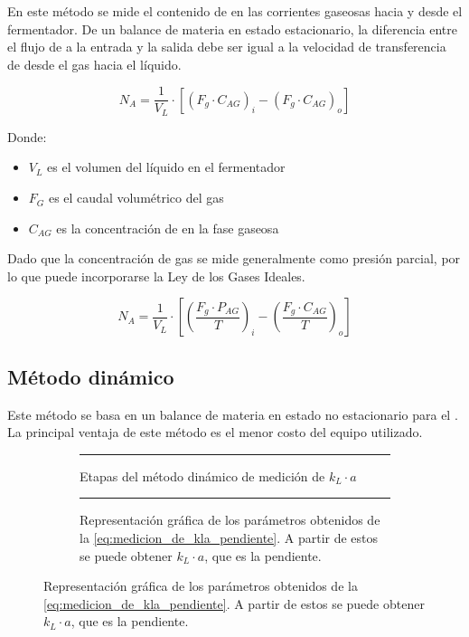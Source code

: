\documentclass{AsignaturaResumen}
\begin{document}
En este método se mide el contenido de  en las corrientes gaseosas hacia y desde el fermentador. De un balance de materia en estado estacionario, la diferencia entre el flujo de  a la entrada y la salida debe ser igual a la velocidad de transferencia de  desde el gas hacia el líquido.

\begin{equation}
    N_{A} = \frac{1}{V_{L}} \cdot \left[(F_{g} \cdot C_{AG})_{i} - (F_{g} \cdot C_{AG})_{o}\right]
\end{equation}

Donde:

\begin{itemize}
    \item $V_{L}$ es el volumen del líquido en el fermentador
    \item $F_{G}$ es el caudal volumétrico del gas
    \item $C_{AG}$ es la concentración de  en la fase gaseosa
\end{itemize}

Dado que la concentración de gas se mide generalmente como presión parcial, por lo que puede incorporarse la Ley de los Gases Ideales.

\begin{equation}
    N_{A} = \frac{1}{V_{L}} \cdot \left[\left(\frac{F_{g} \cdot P_{AG}}{T}\right)_{i} - \left(\frac{F_{g} \cdot C_{AG}}{T}\right)_{o}\right]
\end{equation}

\subsection{Método dinámico}

Este método se basa en un balance de materia en estado no estacionario para el . La principal ventaja de este método es el menor costo del equipo utilizado.

\begin{figure}
    \begin{subfigure}[t]{0.5\linewidth}
        \resizebox{\linewidth}{!}{}
        \rule{\linewidth}{0.5pt}
        \caption{Etapas del método dinámico de medición de $k_{L} \cdot a$}
        \label{fig:medicion_de_kla_metodo_dimanico}
    \end{subfigure}
    \hfill
    \begin{subfigure}[t]{0.475\linewidth}
        \resizebox{\linewidth}{!}{}
        \rule{\linewidth}{0.5pt}
        \caption{Representación gráfica de los parámetros obtenidos de la \autoref{eq:medicion_de_kla_pendiente}. A partir de estos se puede obtener $k_{L} \cdot a$, que es la pendiente.}
        \label{fig:pendiente_de_kla}
    \end{subfigure}
\end{figure}
\end{document}
